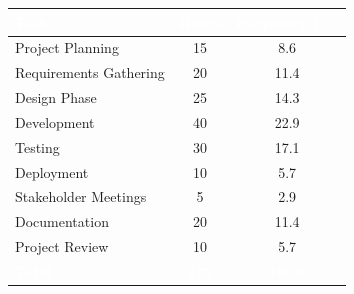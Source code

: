\documentclass[border=10pt]{standalone}
\newcommand{\TableStretchValue}{1.2}
\begin{document}
\renewcommand{\arraystretch}{\TableStretchValue}
\begin{tabular}{>{}l S[table-format=2.0] S[table-format=3.1]}
\toprule
{}
\textcolor{white}{\textbf{Task}} & \textcolor{white}{\textbf{Hours}} & \textcolor{white}{\textbf{Frequency (\%)}} \\
\midrule
Project Planning & 15 & 8.6 \\
Requirements Gathering & 20 & 11.4 \\
Design Phase & 25 & 14.3 \\
Development & 40 & 22.9 \\
Testing & 30 & 17.1 \\
Deployment & 10 & 5.7 \\
Stakeholder Meetings & 5 & 2.9 \\
Documentation & 20 & 11.4 \\
Project Review & 10 & 5.7 \\
\midrule
{}
\textcolor{white}{\textbf{Total}} & \textcolor{white}{\textbf{175}} & \textcolor{white}{\textbf{100.0}} \\
\bottomrule
\end{tabular}
\end{document}

